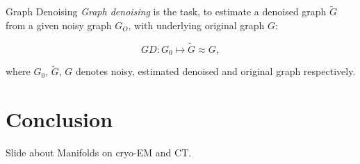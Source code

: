 \documentclass[aspectratio=169]{beamer}
\begin{document}
%
%

\begin{frame}[c]{Graph Denoising}
    \textit{Graph denoising} is the task, to estimate a denoised graph $\tilde{G}$  
    from a given noisy graph $G_O$, with underlying original graph $G$:

    \begin{definition}
        $$GD: G_0 \mapsto \tilde{G} \approx G,$$
    \end{definition}
    where $G_0$, $\tilde{G}$, $G$ denotes noisy, estimated denoised and original graph respectively.
   

\end{frame}

\section{Conclusion}

\begin{frame}
    Slide about Manifolds on cryo-EM and CT.
\end{frame}
\end{document}
